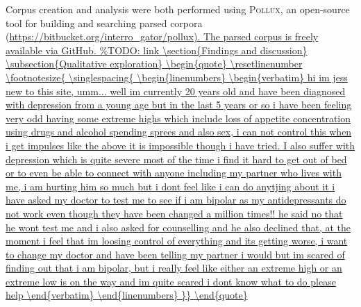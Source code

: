 \documentclass{article}
\begin{document}
Corpus creation and analysis were both performed using \textsc{Pollux}, an open-source tool for building and searching parsed corpora (\url{https://bitbucket.org/interro_gator/pollux). The parsed corpus is freely available via GitHub.

\section{Findings and discussion}



\subsection{Qualitative exploration}

\begin{quote}
\resetlinenumber
\footnotesize{
\singlespacing{
\begin{linenumbers}
\begin{verbatim}
hi im jess new to this site, umm... well im currently 20 years 
old and have been diagnosed with depression from a young age 
but in the last 5 years or so i have been feeling very odd having 
some extreme highs which include loss of appetite concentration
using drugs and alcohol spending sprees and also sex, i can not 
control this when i get impulses like the above it is impossible 
though i have tried. I also suffer with depression which is quite
severe most of the time i find it hard to get out of bed or to 
even be able to connect with anyone including my partner who 
lives with me, i am hurting him so much but i dont feel like i 
can do anytjing about it
    i have asked my doctor to test me to see if i am bipolar as my 
antidepressants do not work even though they have been changed a 
million times!! he said no that he wont test me and i also asked 
for counselling and he also declined that, at the moment i feel 
that im loosing control of everything and its getting worse, i 
want to change my doctor and have been telling my partner i would 
but im scared of finding out that i am bipolar, but i really feel 
like either an extreme high or an extreme low is on the way and 
im quite scared i dont know what to do
    please help \end{verbatim}
\end{linenumbers}
}}
\end{quote}

}
\end{document}
